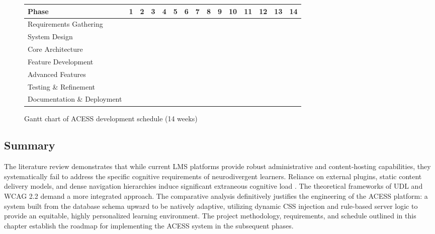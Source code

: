 \documentclass[12pt, oneside]{article} %
\newcommand{\tabbreak}{\hyphenpenalty=200\exhyphenpenalty=200\tolerance=4000\hbadness=10000\hspace{0pt}}
\begin{document}
\begin{figure}[H]
\centering
\footnotesize
\begin{tabular}{|>{\raggedright\arraybackslash\tabbreak}p{3.2cm}|*{14}{c|}}
\hline
\textbf{Phase} & \textbf{1} & \textbf{2} & \textbf{3} & \textbf{4} & \textbf{5} & \textbf{6} & \textbf{7} & \textbf{8} & \textbf{9} & \textbf{10} & \textbf{11} & \textbf{12} & \textbf{13} & \textbf{14} \\ \hline
\hline
Requirements Gathering & \cellcolor{blue!40} & \cellcolor{blue!40} & & & & & & & & & & & & \\ \hline
System Design & & \cellcolor{blue!40} & \cellcolor{blue!40} & \cellcolor{blue!40} & & & & & & & & & & \\ \hline
Core Architecture & & & & \cellcolor{green!40} & \cellcolor{green!40} & \cellcolor{green!40} & \cellcolor{green!40} & & & & & & & \\ \hline
Feature Development & & & & & & & \cellcolor{green!40} & \cellcolor{green!40} & \cellcolor{green!40} & \cellcolor{green!40} & & & & \\ \hline
Advanced Features & & & & & & & & & & \cellcolor{green!40} & \cellcolor{green!40} & \cellcolor{green!40} & & \\ \hline
Testing \& Refinement & & & & & & & & & & & & \cellcolor{orange!40} & \cellcolor{orange!40} & \\ \hline
Documentation \& Deployment & & & & & & & & & & & & & \cellcolor{orange!40} & \cellcolor{orange!40} \\ \hline
\end{tabular}
\caption{Gantt chart of ACESS development schedule (14 weeks)}
\label{fig:gantt}
\end{figure}

\subsection{Summary}

The literature review demonstrates that while current LMS platforms provide robust administrative and content-hosting capabilities, they systematically fail to address the specific cognitive requirements of neurodivergent learners. Reliance on external plugins, static content delivery models, and dense navigation hierarchies induce significant extraneous cognitive load \cite{sweller1988cognitive}. The theoretical frameworks of UDL and WCAG 2.2 demand a more integrated approach. The comparative analysis definitively justifies the engineering of the ACESS platform: a system built from the database schema upward to be natively adaptive, utilizing dynamic CSS injection and rule-based server logic to provide an equitable, highly personalized learning environment. The project methodology, requirements, and schedule outlined in this chapter establish the roadmap for implementing the ACESS system in the subsequent phases.
\end{document}
